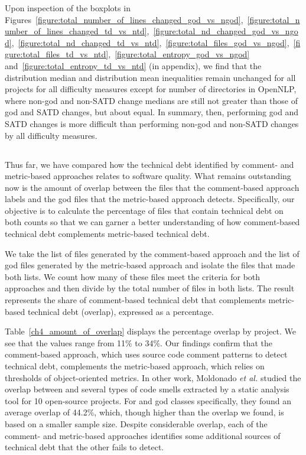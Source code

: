 {Upon inspection of the boxplots in Figures~\ref{figure:total_number_of_lines_changed_god_vs_ngod},~\ref{figure:total_number_of_lines_changed_td_vs_ntd},~\ref{figure:total_nd_changed_god_vs_ngod},~\ref{figure:total_nd_changed_td_vs_ntd},~\ref{figure:total_files_god_vs_ngod},~\ref{figure:total_files_td_vs_ntd},~\ref{figure:total_entropy_god_vs_ngod} and~\ref{figure:total_entropy_td_vs_ntd} (in appendix), we find that the distribution median and distribution mean inequalities remain unchanged for all projects for all difficulty measures except for number of directories in OpenNLP, where non-god and non-SATD change medians are still not greater than those of god and SATD changes, but about equal. In summary, then, performing god and SATD changes is more difficult than performing non-god and non-SATD changes by all difficulty measures.


\subsection*{\chapterIVrqIV}



Thus far, we have compared how the technical debt identified by comment- and metric-based approaches relates to software quality. What remains outstanding now is the amount of overlap between the \SATD files that the comment-based approach labels and the god files that the metric-based approach detects. Specifically, our objective is to calculate the percentage of files that contain technical debt on both counts so that we can garner a better understanding of how comment-based technical debt complements metric-based technical debt.


We take the list of \SATD files generated by the comment-based approach and the list of god files generated by the metric-based approach and isolate the files that made both lists. We count how many of these files meet the criteria for both approaches and then divide by the total number of files in both lists. The result represents the share of comment-based technical debt that complements metric-based technical debt (overlap), expressed as a percentage.



Table~\ref{ch4_amount_of_overlap} displays the percentage overlap by project. We see that the values range from 11\% to 34\%. Our findings confirm that the comment-based approach, which uses source code comment patterns to detect technical debt, complements the metric-based approach, which relies on thresholds of object-oriented metrics. In other work, Moldonado \textit{et al.} \cite{Maldonado_TSE2017} studied the overlap between \SATD and several types of code smells extracted by a static analysis tool for 10 open-source projects. For \SATD and god classes specifically, they found an average overlap of 44.2\%, which, though higher than the overlap we found, is based on a smaller sample size. Despite considerable overlap, each of the comment- and metric-based approaches identifies some additional sources of technical debt that the other fails to detect.

}
